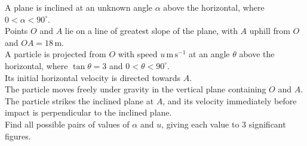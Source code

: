 \documentclass[leqno]{article}
\begin{document}
\begin{enumerate}[
  label=\textbf{\arabic*.},
  leftmargin=*,
  topsep=0pt,
  partopsep=0pt,
  parsep=0pt
]
\newpage

\questionitem

A plane is inclined at an unknown angle $\alpha$ above the horizontal, where $0<\alpha<90^\circ$. \\
Points $O$ and $A$ lie on a line of greatest slope of the plane, with $A$ uphill from $O$ and $OA=18\,\mathrm{m}$. \\

A particle is projected from $O$ with speed $u\,\mathrm{m\,s^{-1}}$ at an angle $\theta$ above the horizontal, where $\tan\theta=3$ and $0<\theta<90^\circ$. \\
Its initial horizontal velocity is directed towards $A$. \\
The particle moves freely under gravity in the vertical plane containing $O$ and $A$. \\

The particle strikes the inclined plane at $A$, and its velocity immediately before impact is perpendicular to the inclined plane. \\

Find all possible pairs of values of $\alpha$ and $u$, giving each value to 3 significant figures.  \\

\vspace*{10pt}

\begin{djsSolution}
\begin{djsSolutionFigure}
\end{djsSolutionFigure}
\end{djsSolution}
\end{enumerate}
\end{document}
